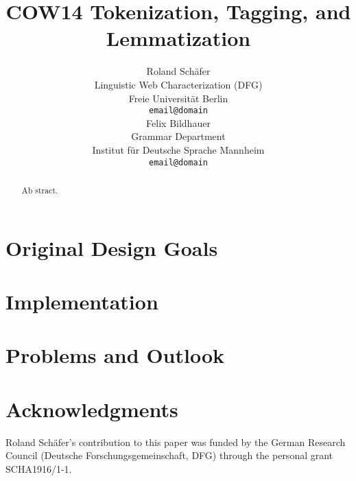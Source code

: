 \documentclass[11pt]{article}
\title{COW14 Tokenization, Tagging, and Lemmatization}
\author{Roland Schäfer \\
  Linguistic Web Characterization (DFG) \\
  Freie Universität Berlin \\
  {\tt email@domain} \\\And
  Felix Bildhauer \\
  Grammar Department \\
  Institut für Deutsche Sprache Mannheim \\
  {\tt email@domain} \\}
\date{}
\begin{document}
\maketitle

\begin{abstract}
  Ab stract.
\end{abstract}

\section{Original Design Goals}

\cite{SchaeferBildhauer2012a}

\section{Implementation}

\section{Problems and Outlook}

\section*{Acknowledgments}

Roland Schäfer's contribution to this paper was funded by the German Research Council (Deutsche Forschungsgemeinschaft, DFG) through the personal grant SCHA1916/1-1.




\end{document}
